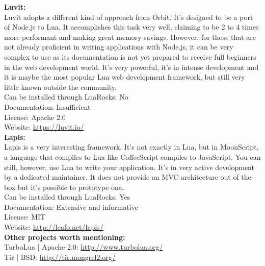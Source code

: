 \documentclass{article}
\begin{document}
\textbf{Luvit:}\\

Luvit adopts a different kind of approach from Orbit. It's designed to be a port of Node.js to Lua. It accomplishes this task very well, claiming to be 2 to 4 times more performant and making great memory savings. However, for those that are not already proficient in writing applications with Node.js, it can be very complex to use as its documentation is not yet prepared to receive full beginners in the web development world. It's very powerful, it's in intense development and it is maybe the most popular Lua web development framework, but still very little known outside the community.\\

Can be installed through LuaRocks: No\\

Documentation: Insufficient\\

License: Apache 2.0\\ 

Website: \url{https://luvit.io/}\\ 

\textbf{Lapis:}\\

Lapis is a very interesting framework. It's not exactly in Lua, but in MoonScript, a language that compiles to Lua like CoffeeScript compiles to JavaScript. You can still, however, use Lua to write your application. It's in very active development by a dedicated maintainer. It does not provide an MVC architecture out of the box but it's possible to prototype one. \\

Can be installed through LuaRocks: Yes\\ 

Documentation: Extensive and informative\\

License: MIT\\

Website: \url{http://leafo.net/lapis/}\\

\textbf{Other projects worth mentioning:}\\

TurboLua | Apache 2.0: \url{http://www.turbolua.org/} \\

Tir | BSD: \url{http://tir.mongrel2.org/} \\
\end{document}

